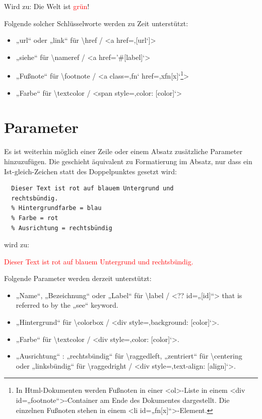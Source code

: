\documentclass{scrartcl}
\begin{document}
{Wird zu:
Die Welt ist \textcolor{red}{grün}!\\}

{Folgende solcher Schlüsselworte werden zu Zeit unterstützt:\\}

\begin{itemize}
\item „url“ oder „link“ für \textbackslash href / <a href=‚{[url‘]}>
\item „siehe“ für \textbackslash nameref / <a href='\#{[label]}‘> 
\item „Fußnote“ für  \textbackslash footnote / <a class=‚fn‘ href=‚xfn{[x]}‘\footnote{In Html-Dokumenten werden Fußnoten in einer <ol>-Liste in einem <div id=„footnote“>-Container am Ende des Dokumentes dargestellt. Die einzelnen Fußnoten stehen in einem <li id=„fn{[x]}“>-Element.}\xspace >
\item „Farbe“ für \textbackslash textcolor / <span style=‚color: {[color]}‘>
\end{itemize}


\section{Parameter}

{Es ist weiterhin möglich einer Zeile oder einem Absatz
zusätzliche Parameter hinzuzufügen. Die geschieht äquivalent
zu Formatierung im Absatz, nur dass ein Ist-gleich-Zeichen
statt des Doppelpunktes gesetzt wird:\\}

\begin{verbatim}
  Dieser Text ist rot auf blauem Untergrund und
  rechtsbündig.
  % Hintergrundfarbe = blau
  % Farbe = rot
  % Ausrichtung = rechtsbündig
\end{verbatim}


{wird zu:\\}

\colorbox{PaleTurquoise1}{\parbox{\linewidth}{%
{\raggedleft%
\textcolor{red}{%
Dieser Text ist rot auf blauem Untergrund und
rechtsbündig.}\\}
}
}

{Folgende Parameter werden derzeit unterstützt:\\}

\begin{itemize}
\item „Name“, „Bezeichnung“ oder  „Label“ für \textbackslash label / <?? id=„{[id]}“> that is
  referred to by the „see“ keyword.
\item „Hintergrund“ für \textbackslash colorbox / <div style=‚background: {[color]}‘>.
\item „Farbe“ für \textbackslash textcolor / <div style=‚color: {[color]}‘>.
\item „Ausrichtung“ :  „rechtsbündig“ für \textbackslash raggedleft,  „zentriert“ für \textbackslash centering oder „linksbündig“ für
  \textbackslash raggedright / <div style=‚text-align: {[align]}‘>.
\end{itemize}
\end{document}
